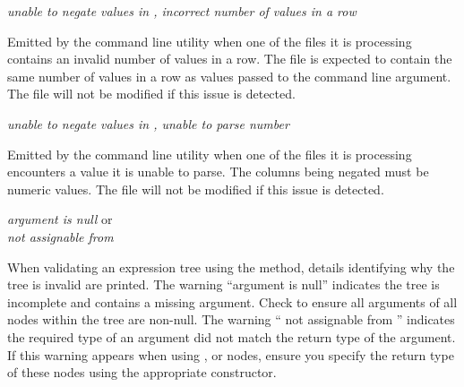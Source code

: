 \noindent
\textit{unable to negate values in , incorrect number of values in a row}
\begin{indented}
  Emitted by the  command line utility when one of the files it is processing contains an invalid number of values in a row.  The file is expected to contain the same number of values in a row as values passed to the  command line argument.  The file will not be modified if this issue is detected.
\end{indented}

\noindent
\textit{unable to negate values in , unable to parse number}
\begin{indented}
  Emitted by the  command line utility when one of the files it is processing encounters a value it is unable to parse.  The columns being negated must be numeric values.  The file will not be modified if this issue is detected.
\end{indented}

\noindent
\textit{argument is null} or\\
\textit{ not assignable from }
\begin{indented}
  When validating an expression tree using the  method, details identifying why the tree is invalid are printed.  The warning ``argument is null'' indicates the tree is incomplete and contains a missing argument. Check to ensure all arguments of all nodes within the tree are non-null. The warning `` not assignable from '' indicates the required type of an argument did not match the return type of the argument.  If this warning appears when using ,  or  nodes, ensure you specify the return type of these nodes using the appropriate constructor.
\end{indented}